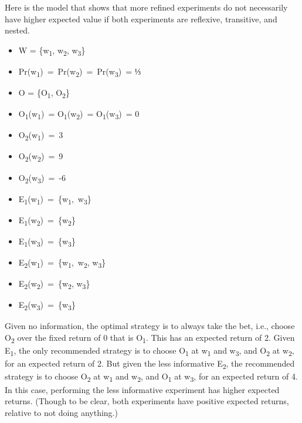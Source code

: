\documentclass[
  10pt,
  letterpaper,
  DIV=11,
  numbers=noendperiod,
  twoside]{scrartcl}
\providecommand{\tightlist}{%
  \setlength{\itemsep}{0pt}\setlength{\parskip}{0pt}}\usepackage{longtable,booktabs,array}
\begin{document}
Here is the model that shows that more refined experiments do not
necessarily have higher expected value if both experiments are
reflexive, transitive, and nested.

\begin{itemize}
\tightlist
\item
  W = \{w\textsubscript{1}, w\textsubscript{2}, w\textsubscript{3}\}
\item
  Pr(w\textsubscript{1})~=~Pr(w\textsubscript{2})~=~Pr(w\textsubscript{3})~=
  ⅓
\item
  O = \{O\textsubscript{1}, O\textsubscript{2}\}
\item
  O\textsubscript{1}(w\textsubscript{1})~=
  O\textsubscript{1}(w\textsubscript{2})~=
  O\textsubscript{1}(w\textsubscript{3})~= 0
\item
  O\textsubscript{2}(w\textsubscript{1})~=~3
\item
  O\textsubscript{2}(w\textsubscript{2})~=~9
\item
  O\textsubscript{2}(w\textsubscript{3})~=~-6
\item
  E\textsubscript{1}(w\textsubscript{1})~=~\{w\textsubscript{1},~w\textsubscript{3}\}
\item
  E\textsubscript{1}(w\textsubscript{2})~=~\{w\textsubscript{2}\}
\item
  E\textsubscript{1}(w\textsubscript{3})~=~\{w\textsubscript{3}\}
\item
  E\textsubscript{2}(w\textsubscript{1})~=~\{w\textsubscript{1},~w\textsubscript{2},
  w\textsubscript{3}\}
\item
  E\textsubscript{2}(w\textsubscript{2})~=~\{w\textsubscript{2},
  w\textsubscript{3}\}
\item
  E\textsubscript{2}(w\textsubscript{3})~=~\{w\textsubscript{3}\}
\end{itemize}

Given no information, the optimal strategy is to always take the bet,
i.e., choose O\textsubscript{2} over the fixed return of 0 that is
O\textsubscript{1}. This has an expected return of 2. Given
E\textsubscript{1}, the only recommended strategy is to choose
O\textsubscript{1} at w\textsubscript{1} and w\textsubscript{3}, and
O\textsubscript{2} at w\textsubscript{2}, for an expected return of 2.
But given the less informative E\textsubscript{2}, the recommended
strategy is to choose O\textsubscript{2} at w\textsubscript{1} and
w\textsubscript{2}, and O\textsubscript{1} at w\textsubscript{3}, for an
expected return of 4. In this case, performing the less informative
experiment has higher expected returns. (Though to be clear, both
experiments have positive expected returns, relative to not doing
anything.)
\end{document}
